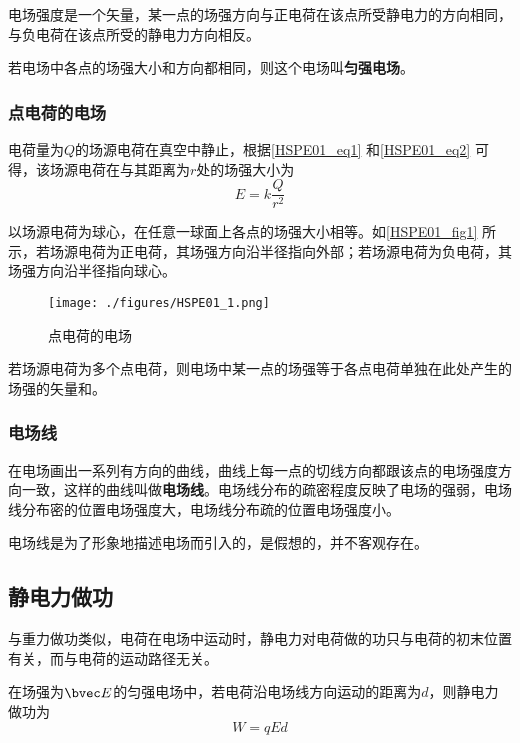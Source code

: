 电场强度是一个矢量，某一点的场强方向与正电荷在该点所受静电力的方向相同，与负电荷在该点所受的静电力方向相反。

若电场中各点的场强大小和方向都相同，则这个电场叫\textbf{匀强电场}。

\subsubsection{点电荷的电场}

电荷量为$Q$的场源电荷在真空中静止，根据\autoref{HSPE01_eq1} 和\autoref{HSPE01_eq2} 可得，该场源电荷在与其距离为$r$处的场强大小为
\begin{equation}
E=k\frac{Q}{r^2}
\end{equation}

以场源电荷为球心，在任意一球面上各点的场强大小相等。如\autoref{HSPE01_fig1} 所示，若场源电荷为正电荷，其场强方向沿半径指向外部；若场源电荷为负电荷，其场强方向沿半径指向球心。

\begin{figure}[ht]
\centering
\texttt{[image: ./figures/HSPE01\_1.png]}
\caption{点电荷的电场} \label{HSPE01_fig1}
\end{figure}

若场源电荷为多个点电荷，则电场中某一点的场强等于各点电荷单独在此处产生的场强的矢量和。

\subsubsection{电场线}

在电场画出一系列有方向的曲线，曲线上每一点的切线方向都跟该点的电场强度方向一致，这样的曲线叫做\textbf{电场线}。电场线分布的疏密程度反映了电场的强弱，电场线分布密的位置电场强度大，电场线分布疏的位置电场强度小。

电场线是为了形象地描述电场而引入的，是假想的，并不客观存在。

\subsection{静电力做功}

与重力做功类似，电荷在电场中运动时，静电力对电荷做的功只与电荷的初末位置有关，而与电荷的运动路径无关。

在场强为$\bvec E$的匀强电场中，若电荷沿电场线方向运动的距离为$d$，则静电力做功为
\begin{equation}\label{HSPE01_eq5}
W=qEd
\end{equation}

